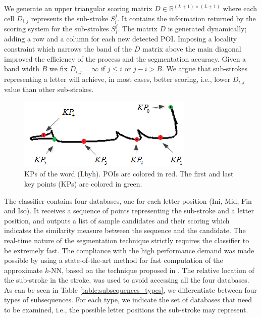 \documentclass[10pt, conference, compsocconf]{IEEEtran}
\begin{document}
We generate an upper triangular scoring matrix $D\in\mathbb{R}^{(L+1)\times (L+1)}$ where each cell $D_{i,j}$ represents the sub-stroke $S_i^j$. It contains the information returned by the scoring system for the sub-strokes $S_i^j$. 
The matrix $D$ is generated dynamically; adding a row and a column for each new detected POI. 
Imposing a locality constraint which narrows the band of the $D$ matrix above the main diagonal improved the efficiency of the process and the segmentation accuracy. 
Given a band width $B$ we fix $D_{i,j}=\infty$ if  $j \leq i$ or $j-i>B$.
We argue that sub-strokes representing a letter will achieve, in most cases, better scoring, i.e., lower $D_{i,j}$ value than other sub-strokes.

\begin{figure}
\centering
\includegraphics[width=0.6\columnwidth]{./figures/candidate_points}
\caption{KPs of the word  (Lbyh). POIs are colored in red. The first and last key points (KPs) are colored in green. }
\label{fig:candidate_points}
\end{figure}

The classifier contains four databases, one for each letter position (Ini, Mid, Fin and Iso). 
It receives a sequence of points representing the sub-stroke and a letter position, and outputs a list of sample candidates and their scoring which indicates the similarity measure between the sequence and the candidate.
The real-time nature of the segmentation technique strictly requires the classifier to be extremely fast.
The compliance with the high performance demand was made possible by using a state-of-the-art method for fast computation of the approximate $k$-NN, based on the technique proposed in \cite{saabni2013efficient}.
The relative location of the sub-stroke in the stroke, was used to avoid accessing all the four databases. 
As can be seen in Table \ref{table:subsequences_types}, we differentiate between four types of subsequences. 
For each type, we indicate the set of databases that need to be examined, i.e., the possible letter positions the sub-stroke may represent. 
\end{document}
